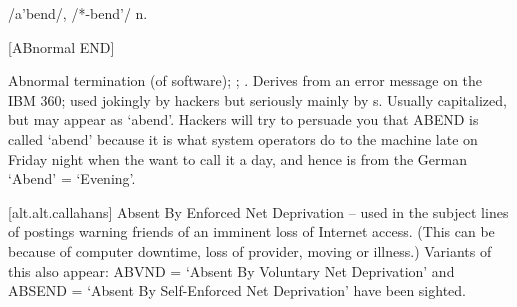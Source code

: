  /a'bend/, /*-bend'/ n.

[ABnormal END]
\begin{inparaenum}
	\item Abnormal termination (of software); ;
		. Derives from an error message on the IBM 360; used
		jokingly by hackers but seriously mainly by s.
		Usually capitalized, but may appear as `abend'.  Hackers will try to
		persuade you that ABEND is called `abend' because it is what system
		operators do to the machine late on Friday night when the want to call
		it a day, and hence is from the German `Abend' = `Evening'.
	\item {[}alt.alt.callahans] Absent By Enforced Net Deprivation -- used in
		the subject lines of postings warning friends of an imminent loss of
		Internet access. (This can be because of computer downtime, loss of
		provider, moving or illness.) Variants of this also appear: ABVND =
		`Absent By Voluntary Net Deprivation' and ABSEND = `Absent By
		Self-Enforced Net Deprivation' have been sighted.
\end{inparaenum}

